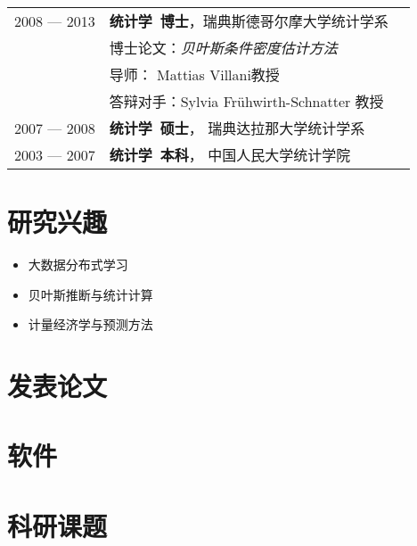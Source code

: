 \documentclass[twoside,a4paper,10pt]{amsart}
\begin{document}
\begin{tabular}{ l  p{} l}
  2008 --- 2013 &\textbf{统计学~博士}，瑞典斯德哥尔摩大学统计学系\\
  & 博士论文：\emph{贝叶斯条件密度估计方法}\\
  & 导师： Mattias Villani教授\\
  & 答辩对手：Sylvia Frühwirth-Schnatter 教授\\

  2007 --- 2008 & \textbf{统计学~硕士}， 瑞典达拉那大学统计学系\\

  2003 --- 2007 & \textbf{统计学~本科}， 中国人民大学统计学院\\
\end{tabular}

\section*{研究兴趣}

\begin{itemize}
\item 大数据分布式学习
\item 贝叶斯推断与统计计算
\item 计量经济学与预测方法

\end{itemize}


\section*{发表论文}
\nocite{wang2021uncertainty}
\nocite{kang2020deja}
\nocite{hao2020bilinear}
\nocite{kang2020gratis}
\nocite{kalesan2020intersections}
\nocite{bailey2019changes}
\nocite{li2019credit}
\nocite{li2018improving}
\nocite{pino2018cohort}
\nocite{li2016distributed}
\nocite{li2013bayesian}
\nocite{li2013efficient}
\nocite{li2011modeling}
\nocite{li2010flexible}
\printbibliography[heading=none,  nottype=software]

\section*{软件}
\nocite{gratis}
\nocite{spark-dlsa}
\printbibliography[heading=none, type=software]

\section*{科研课题}
\end{document}
